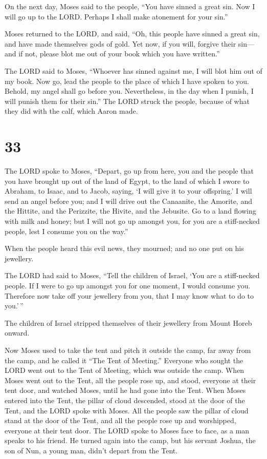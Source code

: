  On the next day, Moses said to the people, ``You have
sinned a great sin. Now I will go up to the LORD. Perhaps I shall make
atonement for your sin.''

 Moses returned to the LORD, and said, ``Oh, this people
have sinned a great sin, and have made themselves gods of gold.
 Yet now, if you will, forgive their sin---and if not,
please blot me out of your book which you have written.''

 The LORD said to Moses, ``Whoever has sinned against me,
I will blot him out of my book.  Now go, lead the people
to the place of which I have spoken to you. Behold, my angel shall go
before you. Nevertheless, in the day when I punish, I will punish them
for their sin.''  The LORD struck the people, because of
what they did with the calf, which Aaron made.

\hypertarget{section-32}{%
\section{33}\label{section-32}}

 The LORD spoke to Moses, ``Depart, go up from here, you
and the people that you have brought up out of the land of Egypt, to the
land of which I swore to Abraham, to Isaac, and to Jacob, saying, `I
will give it to your offspring.'  I will send an angel
before you; and I will drive out the Canaanite, the Amorite, and the
Hittite, and the Perizzite, the Hivite, and the Jebusite. 
Go to a land flowing with milk and honey; but I will not go up amongst
you, for you are a stiff-necked people, lest I consume you on the way.''

 When the people heard this evil news, they mourned; and
no one put on his jewellery.

 The LORD had said to Moses, ``Tell the children of
Israel, `You are a stiff-necked people. If I were to go up amongst you
for one moment, I would consume you. Therefore now take off your
jewellery from you, that I may know what to do to you.'\,''

 The children of Israel stripped themselves of their
jewellery from Mount Horeb onward.

 Now Moses used to take the tent and pitch it outside the
camp, far away from the camp, and he called it ``The Tent of Meeting.''
Everyone who sought the LORD went out to the Tent of Meeting, which was
outside the camp.  When Moses went out to the Tent, all
the people rose up, and stood, everyone at their tent door, and watched
Moses, until he had gone into the Tent.  When Moses
entered into the Tent, the pillar of cloud descended, stood at the door
of the Tent, and the LORD spoke with Moses.  All the
people saw the pillar of cloud stand at the door of the Tent, and all
the people rose up and worshipped, everyone at their tent door.
 The LORD spoke to Moses face to face, as a man speaks to
his friend. He turned again into the camp, but his servant Joshua, the
son of Nun, a young man, didn't depart from the Tent.


